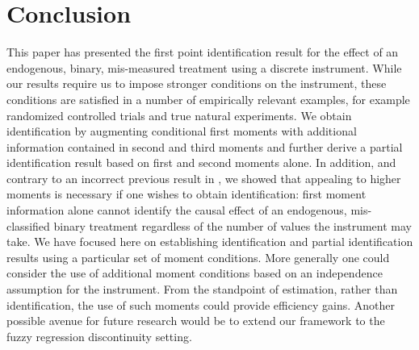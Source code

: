\section{Conclusion}
This paper has presented the first point identification result for the effect of an endogenous, binary, mis-measured treatment using a discrete instrument.
While our results require us to impose stronger conditions on the instrument, these conditions are satisfied in a number of empirically relevant examples, for example randomized controlled trials and true natural experiments.
We obtain identification by augmenting conditional first moments with additional information contained in second and third moments and further derive a partial identification result based on first and second moments alone.
In addition, and contrary to an incorrect previous result in \cite{Mahajan}, we showed that appealing to higher moments is necessary if one wishes to obtain identification: first moment information alone cannot identify the causal effect of an endogenous, mis-classified binary treatment regardless of the number of values the instrument may take.
We have focused here on establishing identification and partial identification results using a particular set of moment conditions. More generally one could consider the use of additional moment conditions based on an independence assumption for the instrument.
From the standpoint of estimation, rather than identification, the use of such moments could provide efficiency gains.
Another possible avenue for future research would be to extend our framework to the fuzzy regression discontinuity setting.
